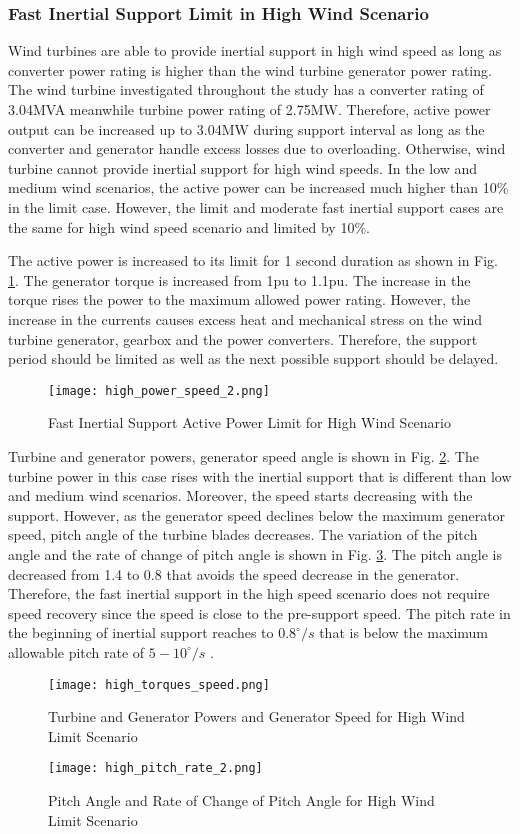 \subsubsection{Fast Inertial Support Limit in High Wind Scenario}
Wind turbines are able to provide inertial support in high wind speed as long as converter power rating is higher than the wind turbine generator power rating. The wind turbine investigated throughout the study has a converter rating of 3.04MVA meanwhile turbine power rating of 2.75MW. Therefore, active power output can be increased up to 3.04MW during support interval as long as the converter and generator handle excess losses due to overloading. Otherwise, wind turbine cannot provide inertial support for high wind speeds. In the low and medium wind scenarios, the active power can be increased much higher than 10\% in the limit case. However, the limit and moderate fast inertial support cases are the same for high wind speed scenario and limited by 10\%.\par
The active power is increased to its limit for 1 second duration as shown in Fig. \ref{high_powers}. The generator torque is increased from 1pu to 1.1pu. The increase in the torque rises the power to the maximum allowed power rating. However, the increase in the currents causes excess heat and mechanical stress on the wind turbine generator, gearbox and the power converters. Therefore, the support period should be limited as well as the next possible support should be delayed. \par
\begin{figure}[h]
	\centering
	\texttt{[image: high\_power\_speed\_2.png]}
	\caption{Fast Inertial Support Active Power Limit for High Wind Scenario}
	\label{high_powers}
\end{figure}
Turbine and generator powers, generator speed angle is shown in Fig. \ref{high_limit_speed}. The turbine power in this case rises with the inertial support that is different than low and medium wind scenarios. Moreover, the speed starts decreasing with the support. However, as the generator speed declines below the maximum generator speed, pitch angle of the turbine blades decreases. 
The variation of the pitch angle and the rate of change of pitch angle is shown in Fig. \ref{pitch_rate}. The pitch angle is decreased from 1.4 to 0.8 that avoids the speed decrease in the generator. Therefore, the fast inertial support in the high speed scenario does not require speed recovery since the speed is close to the pre-support speed. The pitch rate in the beginning of inertial support reaches to $0.8^{\circ}/s$ that is below the maximum allowable pitch rate of $5-10^{\circ}/s$ \cite{Ackermann2005a}. \par
\begin{figure}[h]
	\centering
	\texttt{[image: high\_torques\_speed.png]}
	\caption{Turbine and Generator Powers and Generator Speed for High Wind Limit Scenario}
	\label{high_limit_speed}
\end{figure}
\begin{figure}[h]
	\centering
	\texttt{[image: high\_pitch\_rate\_2.png]}
	\caption{Pitch Angle and Rate of Change of Pitch Angle for High Wind Limit Scenario}
	\label{pitch_rate}
\end{figure}
